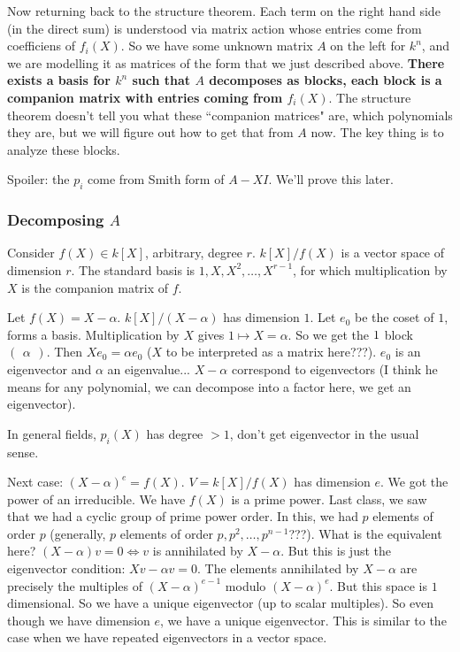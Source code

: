 \documentclass{article}
\theoremstyle{plain}
\theoremstyle{remark}
\begin{document}
Now returning back to the structure theorem.
Each term on the right hand side (in the direct sum) is understood
via matrix action whose entries come from coefficiens of $f_i(X)$.
So we have some unknown matrix $A$ on the left for $k^n$,
and we are modelling it as matrices of the form that we just described above.
\textbf{There exists a basis for $k^n$ such that $A$ decomposes
as blocks, each block is a companion matrix with entries coming from $f_i(X)$}.
The structure theorem doesn't tell you what these ``companion matrices" are,
which polynomials they are, but we will figure out how to get that from $A$ now.
The key thing is to analyze these blocks.

Spoiler: the $p_i$ come from Smith form of $A - XI$. We'll prove this later.

\subsubsection{Decomposing $A$}
Consider $f(X) \in k[X]$, arbitrary, degree $r$.
$k[X]/f(X)$ is a vector space of dimension $r$.
The standard basis is $1,X,X^2,\dots,X^{r-1}$,
for which multiplication by $X$ is the companion matrix of $f$.

Let $f(X) = X - \alpha$. $k[X]/(X-\alpha)$ has dimension $1$.
Let $e_0$ be the coset of $1$, forms a basis.
Multiplication by $X$ gives $1 \mapsto X = \alpha$.
So we get the $1 \time 1$ block $\begin{pmatrix} \alpha \end{pmatrix}$.
Then $Xe_0 = \alpha e_0$ ($X$ to be interpreted as a matrix here???).
$e_0$ is an eigenvector and $\alpha$ an eigenvalue...
$X - \alpha$ correspond to eigenvectors
(I think he means for any polynomial, we can decompose into a factor here,
we get an eigenvector).

In general fields, $p_i(X)$ has degree $> 1$, don't get eigenvector in the usual sense.

Next case: $(X - \alpha)^e = f(X)$.
$V = k[X]/f(X)$ has dimension $e$.
We got the power of an irreducible.
We have $f(X)$ is a prime power.
Last class, we saw that we had a cyclic group of prime power order.
In this, we had $p$ elements of order $p$
(generally, $p$ elements of order $p,p^2,\dots,p^{n-1}$???).
What is the equivalent here?
$(X-\alpha)v = 0 \iff v$ is annihilated by $X- \alpha$.
But this is just the eigenvector condition: $Xv - \alpha v = 0$.
The elements annihilated by $X - \alpha$ are precisely the multiples
of $(X-\alpha)^{e-1}$ modulo $(X-\alpha)^e$.
But this space is $1$ dimensional.
So we have a unique eigenvector (up to scalar multiples).
So even though we have dimension $e$, we have a unique eigenvector.
This is similar to the case when we have repeated eigenvectors in a vector space.
\end{document}
